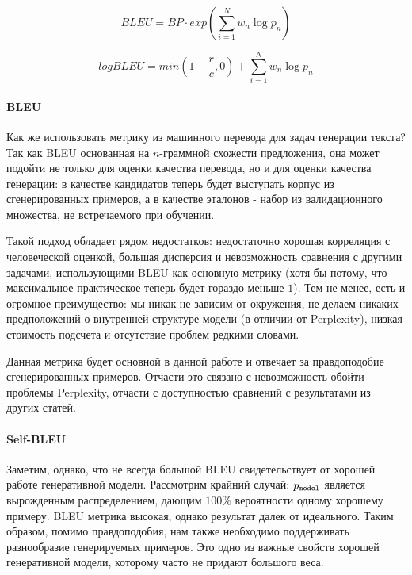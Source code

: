 \documentclass{spbau-diploma}
\begin{document}
\begin{equation}
\label{bleu_final}
BLEU = BP \cdot exp(\sum^{N}_{i=1}{w_n \log{p_n}})
\end{equation}

\begin{equation}
\label{bleu_final_log}
log BLEU = min(1 - \frac{r}{c}, 0) + \sum^{N}_{i=1}{w_n \log{p_n}}
\end{equation}

\paragraph{BLEU}
Как же использовать метрику из машинного перевода для задач генерации текста? 
Так как BLEU основанная на $n$-граммной схожести предложения, она может подойти
не только для оценки качества перевода, но и для оценки качества генерации: в 
качестве кандидатов теперь будет выступать корпус из сгенерированных примеров, а
в качестве эталонов - набор из валидационного множества, не встречаемого при
обучении.

Такой подход обладает рядом недостатков: недостаточно хорошая корреляция с 
человеческой оценкой, большая дисперсия и невозможность сравнения с другими 
задачами, использующими BLEU как основную метрику (хотя бы потому, что 
максимальное практическое теперь будет гораздо меньше $1$). Тем не менее, есть
и огромное преимущество: мы никак не зависим от окружения, не делаем никаких
предположений о внутренней структуре модели (в отличии от Perplexity),  
низкая стоимость подсчета и отсутствие проблем редкими словами.

Данная метрика будет основной в данной работе и отвечает за правдоподобие 
сгенерированных примеров. Отчасти это связано с невозможность обойти проблемы
Perplexity, отчасти с доступностью сравнений с результатами из других статей.

\paragraph{Self-BLEU}
Заметим, однако, что не всегда большой BLEU свидетельствует от хорошей работе
генеративной модели. Рассмотрим крайний случай: $p_{\texttt{model}}$ является вырожденным
распределением, дающим $100\%$ вероятности одному хорошему примеру. BLEU метрика
высокая, однако результат далек от идеального. Таким образом, помимо 
правдоподобия, нам также необходимо поддерживать разнообразие генерируемых 
примеров. Это одно из важные свойств хорошей генеративной модели, которому
часто не придают большого веса.
\end{document}
